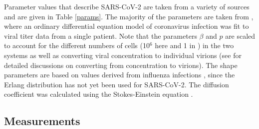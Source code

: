 Parameter values that describe SARS-CoV-2 are taken from a variety of sources and are given in Table \ref{params}. The majority of the parameters are taken from \cite{pinky20}, where an ordinary differential equation model of coronavirus infection was fit to viral titer data from a single patient. Note that the parameters $\beta$ and $p$ are scaled to account for the different numbers of cells (10$^6$ here and 1 in \cite{pinky20}) in the two systems as well as converting viral concentration to individual virions (see \cite{handel07,perelson12,dobrovolny17} for detailed discussions on converting from concentration to virions). The shape parameters are based on values derived from influenza infections \cite{pinilla12}, since the Erlang distribution has not yet been used for SARS-CoV-2. The diffusion coefficient was calculated using the Stokes-Einstein equation \cite{cush97}. 
\begin{table}
\centering
\caption{Parameter values to simulate SARS-CoV-2 infection with the ABM/PDM model.\label{params}}
\end{table}

\subsection{Measurements}

